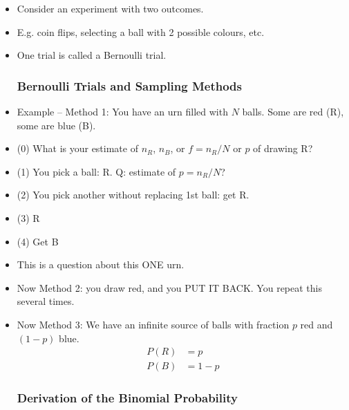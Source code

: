 \begin{itemize}
      \item Consider an experiment with two outcomes.
      \item E.g. coin flips, selecting a ball with 2 possible colours, etc.
      \item One trial is called a Bernoulli trial.

            \subsubsection*{Bernoulli Trials and Sampling Methods}

      \item Example -- Method 1: You have an urn filled with $N$ balls. Some are red (R), some are blue (B).
      \item (0) What is your estimate of $n_R$, $n_B$, or $f = n_R/N$ or $p$ of drawing R?
      \item (1) You pick a ball: R. Q: estimate of $p = n_R/N$?
      \item (2) You pick another without replacing 1st ball: get R.
      \item (3) R
      \item (4) Get B
      \item This is a question about this ONE urn.

      \item Now Method 2: you draw red, and you PUT IT BACK. You repeat this several times.
      \item Now Method 3: We have an infinite source of balls with fraction $p$ red and $(1-p)$ blue.
            \begin{align*}
                  P(R) & = p   \\
                  P(B) & = 1-p
            \end{align*}

            \subsubsection*{Derivation of the Binomial Probability}


\end{itemize}
